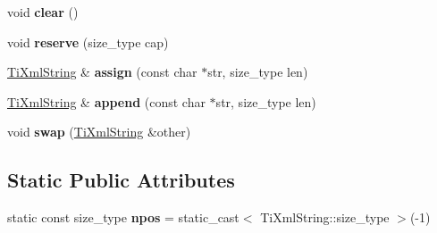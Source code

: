 \begin{DoxyCompactItemize}
\item 
\hypertarget{class_ti_xml_string_ab20e06e4c666abf3bdbfb3a1191d4888}{void {\bfseries clear} ()}\label{class_ti_xml_string_ab20e06e4c666abf3bdbfb3a1191d4888}

\item 
\hypertarget{class_ti_xml_string_a88ecf9f0f00cb5c67b6b637958d7049c}{void {\bfseries reserve} (size\-\_\-type cap)}\label{class_ti_xml_string_a88ecf9f0f00cb5c67b6b637958d7049c}

\item 
\hypertarget{class_ti_xml_string_ac72f3d9149b7812c1e6c59402014d0d5}{\hyperlink{class_ti_xml_string}{\-Ti\-Xml\-String} \& {\bfseries assign} (const char $\ast$str, size\-\_\-type len)}\label{class_ti_xml_string_ac72f3d9149b7812c1e6c59402014d0d5}

\item 
\hypertarget{class_ti_xml_string_ad44b21700d2ec24a511367b222b643fb}{\hyperlink{class_ti_xml_string}{\-Ti\-Xml\-String} \& {\bfseries append} (const char $\ast$str, size\-\_\-type len)}\label{class_ti_xml_string_ad44b21700d2ec24a511367b222b643fb}

\item 
\hypertarget{class_ti_xml_string_aa392cbc180752a79f007f4f9280c7762}{void {\bfseries swap} (\hyperlink{class_ti_xml_string}{\-Ti\-Xml\-String} \&other)}\label{class_ti_xml_string_aa392cbc180752a79f007f4f9280c7762}

\end{DoxyCompactItemize}
\subsection*{\-Static \-Public \-Attributes}
\begin{DoxyCompactItemize}
\item 
\hypertarget{class_ti_xml_string_a8f4422d227088dc7bec96f479b275d0a}{static const size\-\_\-type {\bfseries npos} = static\-\_\-cast$<$ \-Ti\-Xml\-String\-::size\-\_\-type $>$(-\/1)}\label{class_ti_xml_string_a8f4422d227088dc7bec96f479b275d0a}

\end{DoxyCompactItemize}
